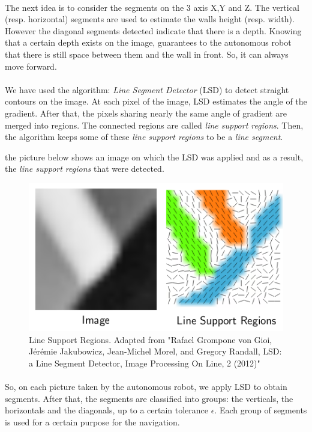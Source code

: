 \documentclass[12pt]{report}
\begin{document}
	 \paragraph{}
	 The next idea is to consider the segments on the 3 axis X,Y and Z. The vertical (resp. horizontal) segments are used to estimate the walls height (resp. width). However the diagonal segments detected indicate that there is a depth. Knowing that a certain depth exists on the image, guarantees to the autonomous robot that there is still space between them and the wall in front. So, it can always move forward.
	  
	  \paragraph{}
	  We have used the algorithm: \textit{Line Segment Detector} (LSD) to detect straight contours on the image. At each pixel of the image, LSD estimates the angle of the gradient. After that, the pixels sharing nearly the same angle of gradient are merged into regions. The connected regions are called \textit{line support regions}. Then, the algorithm keeps some of these \textit{line support regions} to be a \textit{line segment}.
	  
	  the picture below shows an image on which the LSD was applied and as a result, the \textit{line support regions} that were detected.
	  	\begin{figure}[H]
	  	\begin{center}
	  		\includegraphics[scale=0.6]{res/lsr.png}
	  		\caption{Line Support Regions. Adapted from "Rafael Grompone von Gioi, Jérémie Jakubowicz, Jean-Michel Morel, and Gregory Randall, LSD: a Line Segment Detector, Image Processing On Line, 2 (2012)" }
	  	\end{center}
	  \end{figure}
  \paragraph{}
  So, on each picture taken by the autonomous robot, we apply LSD to obtain segments. After that, the segments are classified into groups: the verticals, the horizontals and the diagonals, up to a certain tolerance $\epsilon$. Each group of segments is used for a certain purpose for the navigation.
\end{document}
